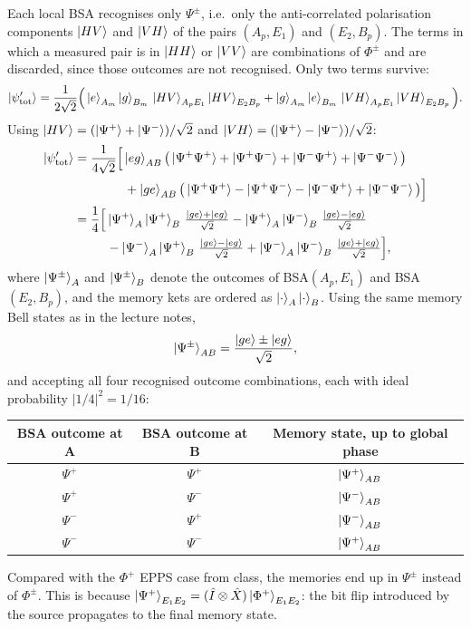 Each local BSA recognises only $\Psi^\pm$, i.e.\ only the anti-correlated polarisation components
$\ket{HV}$ and $\ket{VH}$ of the pairs $(A_p,E_1)$ and $(E_2,B_p)$.
The terms in which a measured pair is in $\ket{HH}$ or $\ket{VV}$ are combinations of $\Phi^\pm$ and
are discarded, since those outcomes are not recognised. Only two terms survive:
\begin{equation}
  \ket{\psi'_\mathrm{tot}} = \frac{1}{2\sqrt2}\Big(
     \ket{e}_{A_m}\ket{g}_{B_m}\,\ket{HV}_{A_pE_1}\ket{HV}_{E_2B_p}
   + \ket{g}_{A_m}\ket{e}_{B_m}\,\ket{VH}_{A_pE_1}\ket{VH}_{E_2B_p}\Big).
\end{equation}
Using
$\ket{HV} = (\ket{\Psi^+}+\ket{\Psi^-})/\sqrt2$ and $\ket{VH} = (\ket{\Psi^+}-\ket{\Psi^-})/\sqrt2$:
\begin{equation}
\begin{aligned}
  \ket{\psi'_\mathrm{tot}} &= \frac{1}{4\sqrt2}\Big[
     \ket{eg}_{AB}\big(\ket{\Psi^+\Psi^+} + \ket{\Psi^+\Psi^-} + \ket{\Psi^-\Psi^+} + \ket{\Psi^-\Psi^-}\big)\\
  &\hspace{4em} + \ket{ge}_{AB}\big(\ket{\Psi^+\Psi^+} - \ket{\Psi^+\Psi^-} - \ket{\Psi^-\Psi^+} + \ket{\Psi^-\Psi^-}\big)\Big]\\
  &= \frac14\Big[
     \ket{\Psi^+}_A\ket{\Psi^+}_B\,\tfrac{\ket{ge}+\ket{eg}}{\sqrt2}
   - \ket{\Psi^+}_A\ket{\Psi^-}_B\,\tfrac{\ket{ge}-\ket{eg}}{\sqrt2}\\
  &\hspace{2.6em}
   - \ket{\Psi^-}_A\ket{\Psi^+}_B\,\tfrac{\ket{ge}-\ket{eg}}{\sqrt2}
   + \ket{\Psi^-}_A\ket{\Psi^-}_B\,\tfrac{\ket{ge}+\ket{eg}}{\sqrt2}\Big],
\end{aligned}
\end{equation}
where $\ket{\Psi^\pm}_A$ and $\ket{\Psi^\pm}_B$ denote the outcomes of BSA$(A_p,E_1)$ and BSA$(E_2,B_p)$, and the
memory kets are ordered as $\ket{\cdot}_A\ket{\cdot}_B$.
Using the same memory Bell states as in the lecture notes,
\begin{equation}
  \ket{\Psi^\pm}_{AB} = \frac{\ket{ge}\pm\ket{eg}}{\sqrt2},
\end{equation}
and accepting all four recognised outcome combinations, each with ideal probability $|1/4|^2 = 1/16$:
\begin{center}
\begin{tabular}{ccc}
  \toprule
  BSA outcome at A & BSA outcome at B & Memory state, up to global phase \\
  \midrule
  $\Psi^+$ & $\Psi^+$ & $\ket{\Psi^+}_{AB}$ \\
  $\Psi^+$ & $\Psi^-$ & $\ket{\Psi^-}_{AB}$ \\
  $\Psi^-$ & $\Psi^+$ & $\ket{\Psi^-}_{AB}$ \\
  $\Psi^-$ & $\Psi^-$ & $\ket{\Psi^+}_{AB}$ \\
  \bottomrule
\end{tabular}
\end{center}
Compared with the $\Phi^+$ EPPS case from class, the memories end up in $\Psi^\pm$ instead of $\Phi^\pm$.
This is because $\ket{\Psi^+}_{E_1E_2} = (\hat I\otimes\hat X)\ket{\Phi^+}_{E_1E_2}$: the bit flip
introduced by the source propagates to the final memory state.

